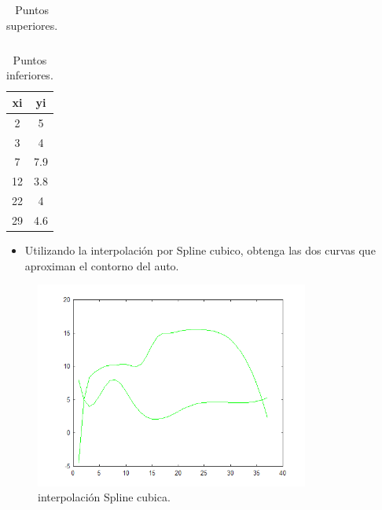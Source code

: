 \documentclass{udpreport}
\begin{document}
\begin{enumerate}
\begin{table}[H]
\begin{tabular} { |c|c|}
        \end{tabular}
        \caption{Puntos superiores.}
    \end{table}
 \vspace{1.8cm}
 
 \begin{table}[H]
    \centering
        \begin{tabular} { |c|c|}
        
        \hline
        xi  &  yi\\
        \hline
        2 &  5       \\
         \hline
        3 &  4        \\
         \hline
        7 &  7.9        \\
         \hline
        12 &  3.8        \\
         \hline
        22 &  4        \\
         \hline
        29 & 4.6        \\
        \end{tabular}
        \caption{Puntos inferiores.}
    \end{table}
 \begin{itemize}
\item Utilizando la interpolación por Spline cubico, obtenga las dos curvas que aproximan el contorno del auto.
\end{itemize}

\begin{figure}[H]
    \centering
    \includegraphics[width=9cm]{interp_spline}
    \caption{interpolación Spline cubica.} \label{fig:interp_spline}
\end{figure}


\end{enumerate}
\end{document}

